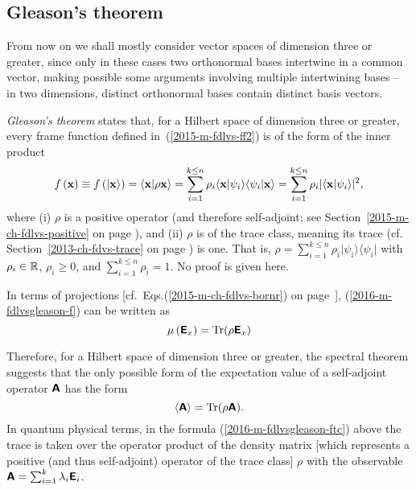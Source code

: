 \subsection{Gleason's theorem}
\label{Gleasontheorem}

From now on we shall mostly consider vector spaces of dimension three or greater,
since only in these cases two  orthonormal bases intertwine in a common vector, making possible
some arguments involving multiple intertwining bases  -- in two dimensions,
distinct orthonormal bases contain distinct basis vectors.


{\em Gleason's theorem}\cite{Gleason,r:dvur-93,pitowsky:218,rich-bridge,peres,hamhalter-book}
states that,
for a Hilbert space of dimension three or greater,
every frame function defined in~(\ref{2015-m-fdlvs-ff2})
is of the form  of the inner product
\begin{equation}
f \left(   {\bf x}   \right)
\equiv
f \left( \vert {\bf x} \rangle \right)
=
\langle {\bf x}  \vert \rho {\bf x} \rangle
=
\sum_{i=1}^{k\le n} \rho_i
\langle {\bf x}  \vert \psi_i\rangle \langle \psi_i \vert {\bf x} \rangle
=
\sum_{i=1}^{k\le n} \rho_i
\vert \langle {\bf x}  \vert \psi_i\rangle \vert^2
,
\label{2016-m-fdlvsgleason-f}
\end{equation}
where
(i) $\rho $
is a positive operator (and therefore self-adjoint;
see Section~\ref{2015-m-ch-fdlvs-positive} on page \pageref{2015-m-ch-fdlvs-positive}),
and
(ii) $\rho $ is
of the trace class,
meaning its trace (cf. Section~\ref{2013-ch-fdvs-trace} on page \pageref{2013-ch-fdvs-trace}) is one.
That is, $\rho=
\sum_{i=1}^{k\le n} \rho_i \vert \psi_i \rangle \langle \psi_i \vert$
with $\rho_i \in {\Bbb R}$, $\rho_i \ge 0$, and $\sum_{i=1}^{k\le n} \rho_i =1$.
No proof is given here.

In terms of projections [cf.~Eqs.(\ref{2015-m-ch-fdlvs-bornr}) on page~\pageref{2015-m-ch-fdlvs-bornr}],
(\ref{2016-m-fdlvsgleason-f}) can be written as
\begin{equation}
\mu \left( \textsf{\textbf{E}}_x \right)
=
{\rm Tr}( \rho  \textsf{\textbf{E}}_x )
\label{2016-m-fdlvsgleason-fproj}
\end{equation}



Therefore, for a Hilbert space of dimension three or greater, the  spectral theorem suggests that
the only possible form of the  expectation value
of a self-adjoint operator  $\textsf{\textbf{A}}$
has the form
\begin{equation}
\langle
\textsf{\textbf{A}}
\rangle
=
\textrm{Tr}({  \rho} \textsf{\textbf{A}}).
\label{2016-m-fdlvsgleason-ftc}
\end{equation}
In quantum physical terms, in the formula (\ref{2016-m-fdlvsgleason-ftc}) above
the trace is taken over
the operator product of the  density matrix [which represents a positive (and thus self-adjoint) operator of the trace class]
${  \rho}$
with the observable $\textsf{\textbf{A}}=\sum_{i=1}^k \lambda_i \textsf{\textbf{E}}_i $.

